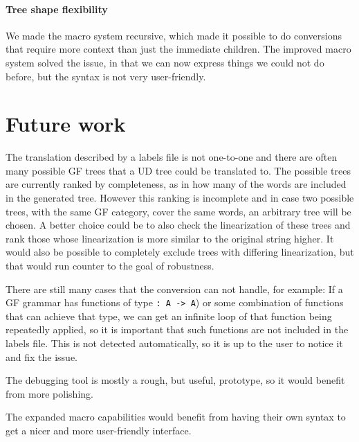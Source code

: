 \paragraph*{Tree shape flexibility}
We made the macro system recursive, which made it possible to do conversions that require more context than just the immediate children. The improved macro system solved the issue, in that we can now express things we could not do before, but the syntax is not very user-friendly.



\section{Future work}

%

The translation described by a labels file is not one-to-one and there are often many possible GF trees that a UD tree could be translated to. The possible trees are currently ranked by completeness, as in how many of the words are included in the generated tree. However this ranking is incomplete and in case two possible trees, with the same GF category, cover the same words, an arbitrary tree will be chosen. A better choice could be to also check the linearization of these trees and rank those whose linearization is more similar to the original string higher. It would also be possible to completely exclude trees with differing linearization, but that would run counter to the goal of robustness.

There are still many cases that the conversion can not handle, for example: If a GF grammar has functions of type \lstinline{: A -> A}) or some combination of functions that can achieve that type, we can get an infinite loop of that function being repeatedly applied, so it is important that such functions are not included in the labels file. This is not detected automatically, so it is up to the user to notice it and fix the issue.

The debugging tool is mostly a rough, but useful, prototype, so it would benefit from more polishing.

The expanded macro capabilities would benefit from having their own syntax to get a nicer and more user-friendly interface.

